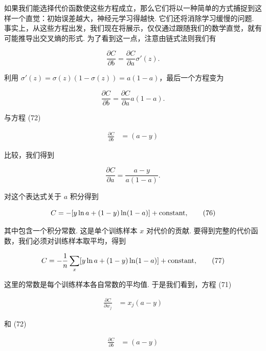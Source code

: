 \noindent 如果我们能选择代价函数使这些方程成立，那么它们将以一种简单的方式捕捉到这样一个直觉：初始误差越大，神经元学习得越快. 它们还将消除学习缓慢的问题. 事实上，从这些方程出发，我们现在将展示，仅仅通过跟随我们的数学直觉，就有可能推导出交叉熵的形式. 为了看到这一点，注意由链式法则我们有

\begin{equation}
\frac{\partial C}{\partial b} = \frac{\partial C}{\partial a} \sigma'(z).
\tag{73}
\end{equation}

\noindent 利用 $\sigma'(z) = \sigma(z)(1-\sigma(z)) = a(1-a)$，最后一个方程变为

\begin{equation}
\frac{\partial C}{\partial b} = \frac{\partial C}{\partial a} a(1-a).
\tag{74}
\end{equation}

\noindent 与方程 (72)

\begin{align*}
\frac{\partial C}{\partial b } &= (a-y) \nonumber
\end{align*}

\noindent 比较，我们得到

\begin{equation}
\frac{\partial C}{\partial a} = \frac{a-y}{a(1-a)}.
\tag{75}
\end{equation}

\noindent 对这个表达式关于 $a$ 积分得到

\begin{equation}
C = -[y \ln a + (1-y) \ln (1-a)]+ {\rm constant},
\tag{76}
\end{equation}

\noindent 其中包含一个积分常数. 这是单个训练样本 $x$ 对代价的贡献. 要得到完整的代价函数，我们必须对训练样本取平均，得到

\begin{equation}
C = -\frac{1}{n} \sum_x [y \ln a +(1-y) \ln(1-a)] + {\rm constant},
\tag{77}
\end{equation}

\noindent 这里的常数是每个训练样本各自常数的平均值. 于是我们看到，方程 (71)

\begin{align*}
\frac{\partial C}{\partial w_j} &= x_j(a-y) \nonumber
\end{align*}

\noindent 和 (72)

\begin{align*}
\frac{\partial C}{\partial b } &= (a-y) \nonumber
\end{align*}

